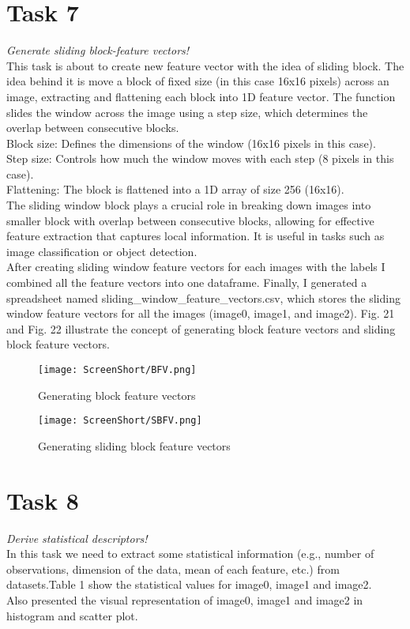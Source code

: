 \documentclass[conference,12pt]{IEEEtran}
\begin{document}
\section{Task 7}
\textit{Generate sliding block-feature vectors!}\\
This task is about to create new feature vector with the idea of sliding block. The idea behind it is move a block of fixed size (in this case 16x16 pixels) across an image, extracting and flattening each block into 1D feature vector. The function slides the window across the image using a step size, which determines the overlap between consecutive blocks. \\
Block size: Defines the dimensions of the window (16x16 pixels in this case).\\
Step size: Controls how much the window moves with each step (8 pixels in this case).\\
Flattening: The block is flattened into a 1D array of size 256 (16x16).\\
The sliding window block plays a crucial role in breaking down images into smaller block with overlap between consecutive blocks, allowing for effective feature extraction that captures local information. It is useful in tasks such as image classification or object detection.\\
After creating sliding window feature vectors for each images with the labels I combined all the feature vectors into one dataframe. Finally, I generated a spreadsheet named sliding\_window\_feature\_vectors.csv, which stores the  sliding window feature vectors for all the images (image0, image1, and image2). Fig. 21 and Fig. 22 illustrate the concept of generating block feature vectors and sliding block feature vectors.
\begin{figure}[h!]
    \centering
    \texttt{[image: ScreenShort/BFV.png]}
    \caption{Generating block feature vectors}
\end{figure}
\begin{figure}[h!]
    \centering
    \texttt{[image: ScreenShort/SBFV.png]}
    \caption{Generating sliding block feature vectors}
\end{figure}

\section{Task 8}
\textit{Derive statistical descriptors!}\\
In this task we need to extract some  statistical information (e.g., number of observations, dimension of the data, mean of each feature, etc.) from datasets.Table 1 show the statistical values for image0, image1 and image2.\\
Also presented the visual representation of image0, image1 and image2 in histogram and scatter plot.
\end{document}
